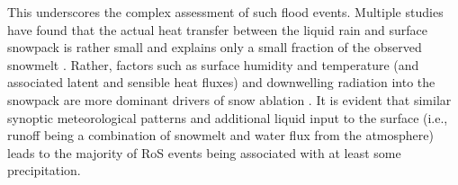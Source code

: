 \documentclass[draft]{agujournal2019}
\begin{document}

This underscores the complex assessment of such flood events. 
Multiple studies have found that the actual heat transfer between the liquid rain and surface snowpack is rather small and explains only a small fraction of the observed snowmelt \citep{moore1984controls}. 
Rather, factors such as surface humidity and temperature (and associated latent and sensible heat fluxes) and downwelling radiation into the snowpack are more dominant drivers of snow ablation \citep{mazurkiewicz2008assessing,wurzer2016influence,harpold2018humidity}. 
It is evident that similar synoptic meteorological patterns \citep{grote2021synoptic} and additional liquid input to the surface (i.e., runoff being a combination of snowmelt and water flux from the atmosphere) leads to the majority of RoS events being associated with at least some precipitation.
\end{document}
